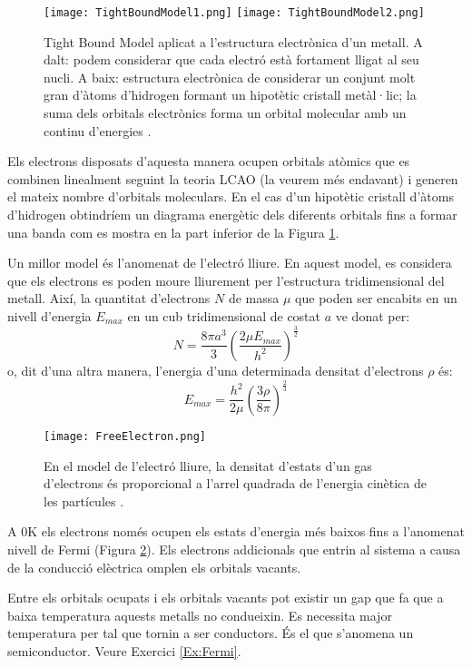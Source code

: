 \begin{figure}[h]
\centering
\texttt{[image: TightBoundModel1.png]}
\texttt{[image: TightBoundModel2.png]}
\caption[Tight Bound Model]{Tight Bound Model aplicat a l'estructura electrònica d'un metall. A dalt: podem considerar que cada electró està fortament lligat al seu nucli. A baix: estructura electrònica de considerar un conjunt molt gran d'àtoms d'hidrogen formant un hipotètic cristall metàl·lic; la suma dels orbitals electrònics forma un orbital molecular  amb un continu d'energies \citep{yen_chemistry_2008}.}
\label{fig:TightBoundModel}
\end{figure}

Els electrons disposats d'aquesta manera ocupen orbitals atòmics que es combinen linealment seguint la teoria LCAO (la veurem més endavant) i generen el mateix nombre d'orbitals moleculars. En el cas d'un hipotètic cristall d'àtoms d'hidrogen obtindríem un diagrama energètic dels diferents orbitals fins a formar una banda com es mostra en la part inferior de la Figura \ref{fig:TightBoundModel}.

Un millor model és l'anomenat de l'electró lliure. 
En aquest model, es considera que els electrons es poden moure lliurement per l'estructura tridimensional del metall. 
Així, la quantitat d'electrons $N$ de massa $\mu$ que poden ser encabits en un nivell d'energia $E_{max}$ en un cub tridimensional de costat $a$ ve donat per:
\[
N=\frac{8 \pi a^3}{3} \left( \frac{2 \mu E_{max}}{h^2} \right)^{\frac{3}{2}}
\]
o, dit d'una altra manera, l'energia d'una determinada densitat d'electrons $\rho$ és:
\[E_{max} = \frac{h^2}{2 \mu} \left( \frac{3 \rho}{8 \pi} \right)^{\frac{2}{3}}\]

\begin{figure}[h]
\centering
\texttt{[image: FreeElectron.png]}
\caption[Model de l'electró lliure]{En el model de l'electró lliure, la densitat d'estats d'un gas d'electrons és proporcional a l'arrel quadrada de l'energia cinètica de les partícules \citep{yen_chemistry_2008}. }
\label{fig:FreeElectron}
\end{figure}

A 0K els electrons només ocupen els estats d'energia més baixos fins a l'anomenat nivell de Fermi (Figura \ref{fig:FreeElectron}). Els electrons addicionals que entrin al sistema a causa de la conducció elèctrica omplen els orbitals vacants.

Entre els orbitals ocupats i els orbitals vacants pot existir un gap que fa que a baixa temperatura aquests metalls no condueixin. Es necessita major temperatura per tal que tornin a ser conductors. 
És el que s'anomena un semiconductor. Veure Exercici \ref{Ex:Fermi}.

